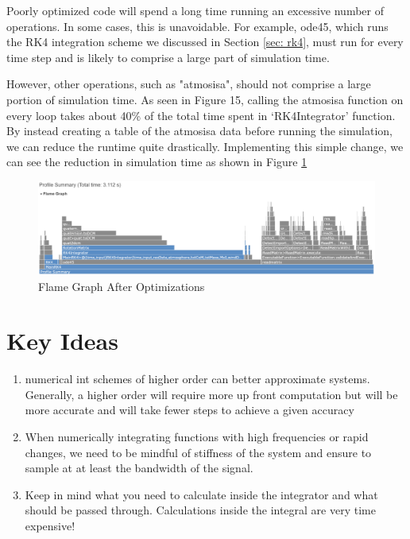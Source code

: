 \documentclass[12pt]{report}
\begin{document}
Poorly optimized code will spend a long time running an excessive number of operations. In some cases, this is unavoidable. For example, ode45, which runs the RK4 integration scheme we discussed in Section \ref{sec: rk4}, must run for every time step and is likely to comprise a large part of simulation time.

However, other operations, such as "atmosisa", should not comprise a large portion of simulation time. As seen in Figure 15, calling the atmosisa function on every loop takes about 40\% of the total time spent in ‘RK4Integrator’ function. By instead creating a table of the atmosisa data before running the simulation, we can reduce the runtime quite drastically. Implementing this simple change, we can see the reduction in simulation time as shown in Figure \ref{fig:flame2}

\begin{figure}
    \centering
    \includegraphics[width=\linewidth]{Images/FlameGraph2.png}
    \caption{Flame Graph After Optimizations}
    \label{fig:flame2}
\end{figure}

\section{Key Ideas}
\begin{enumerate}
    \item \Gls{numerical int} schemes of higher order can better approximate systems. Generally, a higher order will require more up front computation but will be more accurate and will take fewer steps to achieve a given accuracy
    \item When numerically integrating functions with high frequencies or rapid changes, we need to be mindful of stiffness of the system and ensure to sample at at least the \gls{bandwidth} of the signal.
    \item Keep in mind what you need to calculate inside the integrator and what should be passed through. Calculations inside the integral are very time expensive!
\end{enumerate}
\end{document}
